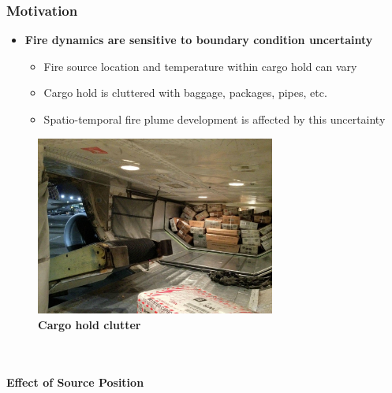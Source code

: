 \documentclass[9pt]{beamer}
\begin{document}
\begin{frame}
\frametitle{Motivation}
\label{sec-4-3}

\begin{itemize}
\item \textbf{Fire dynamics are sensitive to boundary condition uncertainty}
\begin{itemize}
\item Fire source location and temperature within cargo hold can vary
\item Cargo hold is cluttered with baggage, packages, pipes, etc.
\item Spatio-temporal fire plume development is affected by this uncertainty
\end{itemize}
\end{itemize}

\begin{minipage}[b]{0.45\linewidth}
\centering
\begin{figure}[ht]
\includegraphics[width=0.7\textwidth]{CargoHoldClutter} \\
\textbf{Cargo hold clutter}
\end{figure}
\end{minipage}
\begin{minipage}[b]{0.45\linewidth}
\centering
{} \\
 \\
\textbf{Effect of Source Position}
\end{minipage}
\end{frame}
\end{document}
